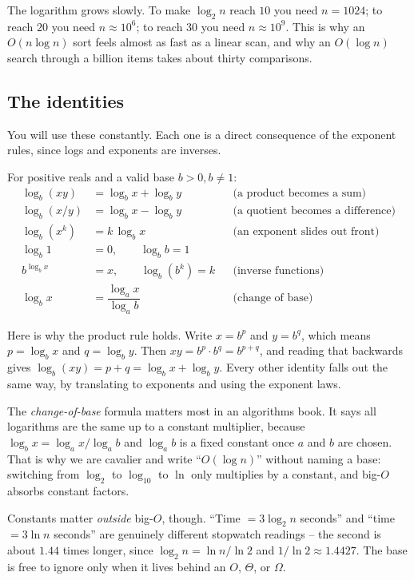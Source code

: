 The logarithm grows slowly. To make $\log_2 n$ reach $10$ you need
$n = 1024$; to reach $20$ you need $n \approx 10^6$; to reach $30$ you need
$n \approx 10^9$. This is why an $O(n \log n)$ sort feels almost as
fast as a linear scan, and why an $O(\log n)$ search through a billion items takes
about thirty comparisons.

\subsection{The identities}

You will use these constantly. Each one is a direct consequence of the
exponent rules, since logs and exponents are inverses.

\begin{formalbox}
For positive reals and a valid base $b > 0, b \ne 1$:
\begin{align*}
\log_b(xy)       &= \log_b x + \log_b y
   &&\text{(a product becomes a sum)}\\
\log_b(x/y)      &= \log_b x - \log_b y
   &&\text{(a quotient becomes a difference)}\\
\log_b(x^k)      &= k\,\log_b x
   &&\text{(an exponent slides out front)}\\
\log_b 1         &= 0, \qquad \log_b b = 1 \\
b^{\log_b x}     &= x, \qquad \log_b(b^k) = k
   &&\text{(inverse functions)}\\
\log_b x         &= \dfrac{\log_a x}{\log_a b}
   &&\text{(change of base)}
\end{align*}
\end{formalbox}

Here is why the product rule holds. Write
$x = b^p$ and $y = b^q$, which means $p = \log_b x$ and $q = \log_b y$.
Then $xy = b^p \cdot b^q = b^{p+q}$, and reading that backwards gives
$\log_b(xy) = p + q = \log_b x + \log_b y$. Every other identity falls out the
same way, by translating to exponents and using the exponent laws.

The \emph{change-of-base} formula matters most in an algorithms book.
It says all logarithms are the same up to a constant multiplier, because
$\log_b x = \log_a x / \log_a b$ and $\log_a b$ is a fixed constant once $a$ and
$b$ are chosen. That is why we are cavalier and write ``$O(\log n)$'' without
naming a base: switching from $\log_2$ to $\log_{10}$ to $\ln$ only multiplies by
a constant, and big-$O$ absorbs constant factors.

\begin{trapbox}
Constants matter \emph{outside} big-$O$, though. ``Time $= 3 \log_2 n$ seconds''
and ``time $= 3 \ln n$ seconds'' are genuinely different stopwatch readings -- the
second is about $1.44$ times longer, since $\log_2 n = \ln n / \ln 2$ and
$1/\ln 2 \approx 1.4427$. The base is free to ignore only when it lives behind an
$O$, $\Theta$, or $\Omega$.
\end{trapbox}

